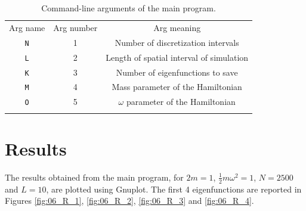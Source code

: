 \documentclass[pra, onecolumn, notitlepage, floats, 11pt]{revtex4-1}
\newcommand{\code}[2][black]{\color{#1}\texttt{#2}}
\begin{document}
\begin{table}[!h]
    \begin{tabular}{ccc}
        \toprule
        Arg name    &   Arg number  &   Arg meaning \\
        \colrule
        \code{N}    &   1   &   Number of discretization intervals  \\
        \code{L}    &   2   &   Length of spatial interval of simulation  \\
        \code{K}    &   3   &   Number of eigenfunctions to save   \\
        \code{M}    &   4   &   Mass parameter of the Hamiltonian   \\
        \code{O}    &   5   &   \( \omega \) parameter of the Hamiltonian   \\
        \botrule
    \end{tabular}
    \caption{Command-line arguments of the main program.}
    \label{tab:06_C_SS_3_1}
\end{table}





\section{Results}
The results obtained from the main program, for \( 2m=1 \), \( \frac{1}{2}m\omega^2 = 1 \), \( N=2500 \) and \( L = 10 \), are plotted using Gnuplot. The first 4 eigenfunctions are reported in Figures \ref{fig:06_R_1}, \ref{fig:06_R_2}, \ref{fig:06_R_3} and \ref{fig:06_R_4}.
\end{document}
